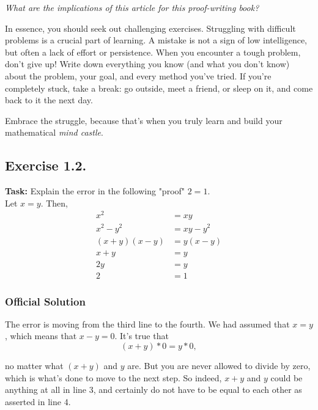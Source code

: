 \documentclass{article}
\begin{document}
\vspace{1em} %
\textit{What are the implications of this article for this proof-writing book?}
\vspace{1em} %

\noindent In essence, you should seek out challenging exercises. Struggling with difficult problems is a crucial part of learning. A mistake is not a sign of low intelligence, but often a lack of effort or persistence. When you encounter a tough problem, don’t give up! Write down everything you know (and what you don’t know) about the problem, your goal, and every method you’ve tried. If you’re completely stuck, take a break: go outside, meet a friend, or sleep on it, and come back to it the next day.

Embrace the struggle, because that’s when you truly learn and build your mathematical \textit{mind castle}.

\newpage 

\subsection{Exercise 1.2.}
\textbf{Task:} Explain the error in the following "proof" $2 = 1$. \\ Let $x = y$. Then,\\
\begin{align*}
    x^2 &= xy \\
    x^2 - y^2 &= xy - y^2 \\
    (x + y)(x - y) &= y(x - y) \\
    x + y &= y \\
    2y &= y \\
    2 &= 1
\end{align*}

\subsubsection*{Official Solution}

The error is moving from the third line to the fourth. We had assumed that $x=y$, which means that $x-y=0$. It's true that
\[(x+y)*0=y*0,\]

no matter what $(x+y)$ and $y$ are. But you are never allowed to divide by zero, which is what's done to move to the next step. So indeed, $x+y$ and $y$ could be anything at all in line 3, and certainly do not have to be equal to each other as asserted in line 4.\\
\end{document}
